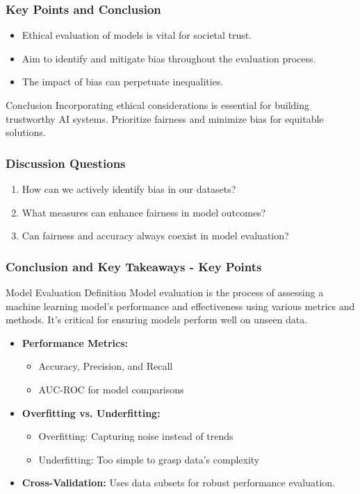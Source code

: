 \documentclass[aspectratio=169]{beamer}
\begin{document}
\begin{frame}
    \frametitle{Key Points and Conclusion}
    \begin{itemize}
        \item Ethical evaluation of models is vital for societal trust.
        \item Aim to identify and mitigate bias throughout the evaluation process.
        \item The impact of bias can perpetuate inequalities.
    \end{itemize}
    \begin{block}{Conclusion}
        Incorporating ethical considerations is essential for building trustworthy AI systems. Prioritize fairness and minimize bias for equitable solutions.
    \end{block}
\end{frame}

\begin{frame}
    \frametitle{Discussion Questions}
    \begin{enumerate}
        \item How can we actively identify bias in our datasets?
        \item What measures can enhance fairness in model outcomes?
        \item Can fairness and accuracy always coexist in model evaluation?
    \end{enumerate}
\end{frame}

\begin{frame}[fragile]
    \frametitle{Conclusion and Key Takeaways - Key Points}
    \begin{block}{Model Evaluation Definition}
    Model evaluation is the process of assessing a machine learning model's performance and effectiveness using various metrics and methods. It's critical for ensuring models perform well on unseen data.
    \end{block}

    \begin{itemize}
        \item \textbf{Performance Metrics:}
        \begin{itemize}
            \item Accuracy, Precision, and Recall
            \item AUC-ROC for model comparisons
        \end{itemize}
        
        \item \textbf{Overfitting vs. Underfitting:}
        \begin{itemize}
            \item Overfitting: Capturing noise instead of trends
            \item Underfitting: Too simple to grasp data's complexity
        \end{itemize}
        
        \item \textbf{Cross-Validation:}
        Uses data subsets for robust performance evaluation.
    \end{itemize}
\end{frame}
\end{document}
